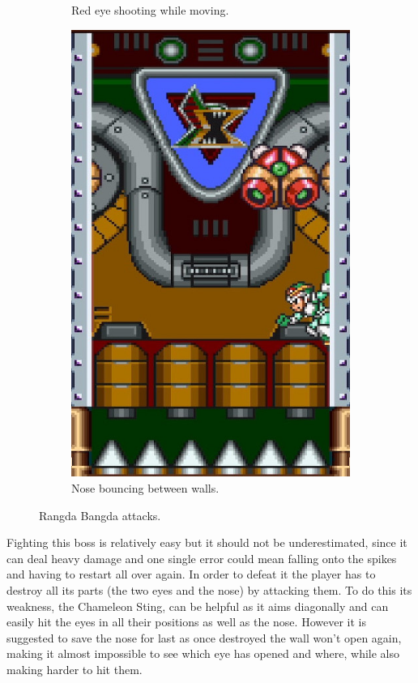 \begin{figure}[htp]
\begin{subfigure}{0.40\linewidth}
		\caption{Red eye shooting while moving.}
	\end{subfigure}
	\hfil
	\begin{subfigure}{0.30\linewidth}
		\centering
		\includegraphics[width=\linewidth]{figures/X1/Sigma_stages/Rangda_nose.jpg}
		\caption{Nose bouncing between walls.}
	\end{subfigure}
	\caption{Rangda Bangda attacks.}
\end{figure} 
Fighting this boss is relatively easy but it should not be underestimated, since it can deal heavy damage and one single error could mean falling onto the spikes and having to restart all over again. In order to defeat it the player has to destroy all its parts (the two eyes and the nose)  by attacking them. To do this its weakness, the Chameleon Sting, can be helpful as it aims diagonally and can easily hit the eyes in all their positions as well as the nose. However it is suggested to save the nose for last as once destroyed the wall won't open again, making it almost impossible to see which eye has opened and where, while also making harder to hit them.

